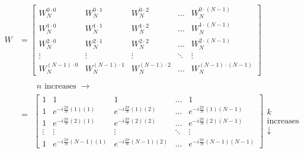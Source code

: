 \documentclass[../linear-algebra.tex]{subfiles}
\begin{document}
\begin{align*}
    W &= \begin{bmatrix}
    W_N^{0\cdot0} & W_N^{0\cdot1} & W_N^{0\cdot2} & \dots & W_N^{0\cdot(N-1)} \\
    W_N^{1\cdot0} & W_N^{1\cdot1} & W_N^{1\cdot2} & \dots & W_N^{1\cdot(N-1)} \\
    W_N^{2\cdot0} & W_N^{2\cdot1} & W_N^{2\cdot2} & \dots & W_N^{2\cdot(N-1)} \\
    \vdots & \vdots & \vdots & \ddots & \vdots \\
    W_N^{(N-1)\cdot0} & W_N^{(N-1)\cdot1} & W_N^{(N-1)\cdot2} & \dots & W_N^{(N-1)\cdot(N-1)}
\end{bmatrix}\\
    &=
    \begin{matrix}
        \begin{matrix} n \text{ increases } \longrightarrow \end{matrix} \\
        \begin{bmatrix} 
            1 & 1 & 1 & \dots & 1 \\ 
            1 & e^{-i\frac{2\pi}{N}(1)(1)} & e^{-i\frac{2\pi}{N}(1)(2)} & \dots & e^{-i\frac{2\pi}{N}(1)(N-1)} \\ 
            1 & e^{-i\frac{2\pi}{N}(2)(1)} & e^{-i\frac{2\pi}{N}(2)(2)} & \dots & e^{-i\frac{2\pi}{N}(2)(N-1)} \\ 
            \vdots & \vdots & \vdots & \ddots & \vdots \\ 
            1 & e^{-i\frac{2\pi}{N}(N-1)(1)} & e^{-i\frac{2\pi}{N}(N-1)(2)} & \dots & e^{-i\frac{2\pi}{N}(N-1)(N-1)} 
        \end{bmatrix}
        \begin{matrix} 
            k \\ \text{increases} \\ \downarrow 
        \end{matrix} 
    \end{matrix}
\end{align*}\\
\end{document}

